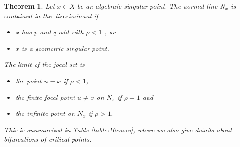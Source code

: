 \documentclass[12pt,a4,twoside]{amsart}
\newtheorem{theorem}{Theorem}
\newtheorem*{main lemma}{The main lemma}
\begin{document}
\begin{theorem}\label{t:NinD} 
Let $x \in X$ be an algebraic singular point.
The normal  line $N_x$ is contained in  the discriminant if
\begin{itemize}
\item  $x$ has $p$ and $q$  odd  with $\rho < 1$ , or
\item $x$ is a geometric singular point.
\end{itemize}
The limit of the focal set is\begin{itemize}
\item the point $u=x$ if $\rho < 1$, 
\item the finite focal point $u \ne x$ on $N_x$ if $\rho =1$ and 
\item the infinite point on $N_x$ if $\rho > 1$.
\end{itemize}

This is summarized in Table \ref{table:10cases}, where we also give details about bifurcations of critical points.
\end{theorem}
\end{document}
